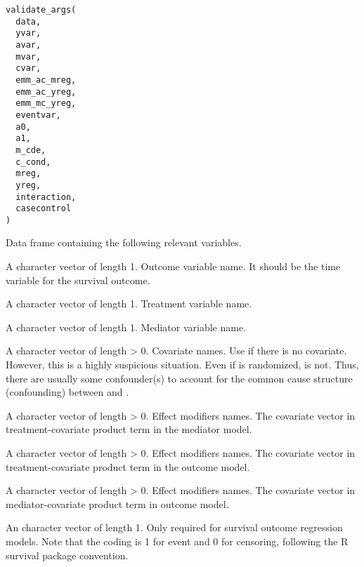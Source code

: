 \documentclass[a4paper]{book}
\begin{document}
%
\begin{Usage}
\begin{verbatim}
validate_args(
  data,
  yvar,
  avar,
  mvar,
  cvar,
  emm_ac_mreg,
  emm_ac_yreg,
  emm_mc_yreg,
  eventvar,
  a0,
  a1,
  m_cde,
  c_cond,
  mreg,
  yreg,
  interaction,
  casecontrol
)
\end{verbatim}
\end{Usage}
%
\begin{Arguments}
\begin{ldescription}
\item[\code{data}] Data frame containing the following relevant variables.

\item[\code{yvar}] A character vector of length 1. Outcome variable name. It should be the time variable for the survival outcome.

\item[\code{avar}] A character vector of length 1. Treatment variable name.

\item[\code{mvar}] A character vector of length 1. Mediator variable name.

\item[\code{cvar}] A character vector of length > 0. Covariate names. Use  if there is no covariate. However, this is a highly suspicious situation. Even if  is randomized,  is not. Thus, there are usually some confounder(s) to account for the common cause structure (confounding) between  and .

\item[\code{emm\_ac\_mreg}] A character vector of length > 0. Effect modifiers names. The covariate vector in treatment-covariate product term in the mediator model.

\item[\code{emm\_ac\_yreg}] A character vector of length > 0. Effect modifiers names. The covariate vector in treatment-covariate product term in the outcome model.

\item[\code{emm\_mc\_yreg}] A character vector of length > 0. Effect modifiers names. The covariate vector in mediator-covariate product term in outcome model.

\item[\code{eventvar}] An character vector of length 1. Only required for survival outcome regression models. Note that the coding is 1 for event and 0 for censoring, following the R survival package convention.


\end{ldescription}
\end{Arguments}
\end{document}
